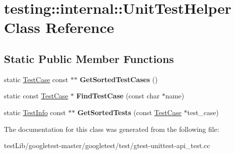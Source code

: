 \hypertarget{classtesting_1_1internal_1_1UnitTestHelper}{}\section{testing\+:\+:internal\+:\+:Unit\+Test\+Helper Class Reference}
\label{classtesting_1_1internal_1_1UnitTestHelper}
\subsection*{Static Public Member Functions}
\begin{DoxyCompactItemize}
\item 
\mbox{\label{classtesting_1_1internal_1_1UnitTestHelper_a9a549307062083d10358638af272cc98}} 
static \hyperlink{classtesting_1_1TestCase}{Test\+Case} const  $\ast$$\ast$ {\bfseries Get\+Sorted\+Test\+Cases} ()
\item 
\mbox{\label{classtesting_1_1internal_1_1UnitTestHelper_a46303cbb7a6abb456f7b1350542113ac}} 
static const \hyperlink{classtesting_1_1TestCase}{Test\+Case} $\ast$ {\bfseries Find\+Test\+Case} (const char $\ast$name)
\item 
\mbox{\label{classtesting_1_1internal_1_1UnitTestHelper_a02602d22fb74566dad78c0c9d4f24e78}} 
static \hyperlink{classtesting_1_1TestInfo}{Test\+Info} const  $\ast$$\ast$ {\bfseries Get\+Sorted\+Tests} (const \hyperlink{classtesting_1_1TestCase}{Test\+Case} $\ast$test\+\_\+case)
\end{DoxyCompactItemize}


The documentation for this class was generated from the following file\+:\begin{DoxyCompactItemize}
\item 
test\+Lib/googletest-\/master/googletest/test/gtest-\/unittest-\/api\+\_\+test.\+cc\end{DoxyCompactItemize}
